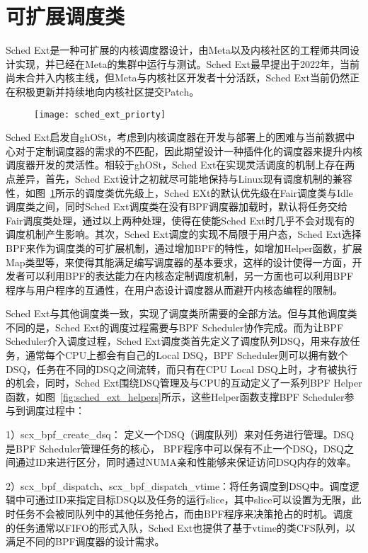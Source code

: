 \section{可扩展调度类}

Sched Ext是一种可扩展的内核调度器设计\citep{schedext}，由Meta以及内核社区的工程师共同设计实现，并已经在Meta的集群中运行与测试。Sched Ext最早提出于2022年，当前尚未合并入内核主线，但Meta与内核社区开发者十分活跃，Sched Ext当前仍然正在积极更新并持续地向内核社区提交Patch。

\begin{figure}[!htbp]
    \centering
    \texttt{[image: sched\_ext\_priorty]}
    \label{fig:sched_ext_priorty}
\end{figure}

Sched Ext启发自ghOSt\citep{humphries2021ghost}，考虑到内核调度器在开发与部署上的困难与当前数据中心对于定制调度器的需求的不匹配，因此期望设计一种插件化的调度器来提升内核调度器开发的灵活性。相较于ghOSt，Sched Ext在实现灵活调度的机制上存在两点差异，首先，Sched Ext设计之初就尽可能地保持与Linux现有调度机制的兼容性，如图~\ref{fig:sched_ext_priorty}所示的调度类优先级上，Sched EXt的默认优先级在Fair调度类与Idle调度类之间，同时Sched Ext调度类在没有BPF调度器加载时，默认将任务交给Fair调度类处理，通过以上两种处理，使得在使能Sched Ext时几乎不会对现有的调度机制产生影响。其次，Sched Ext调度的实现不局限于用户态，Sched Ext选择BPF来作为调度类的可扩展机制，通过增加BPF的特性，如增加Helper函数，扩展Map类型等，来使得其能满足编写调度器的基本要求，这样的设计使得一方面，开发者可以利用BPF的表达能力在内核态定制调度机制，另一方面也可以利用BPF程序与用户程序的互通性，在用户态设计调度器从而避开内核态编程的限制。

Sched Ext与其他调度类一致，实现了调度类所需要的全部方法。但与其他调度类不同的是，Sched Ext的调度过程需要与BPF Scheduler协作完成。而为让BPF Scheduler介入调度过程，Sched Ext调度类首先定义了调度队列DSQ，用来存放任务，通常每个CPU上都会有自己的Local DSQ，BPF Scheduler则可以拥有数个DSQ，任务在不同的DSQ之间流转，而只有在CPU Local DSQ上时，才有被执行的机会，同时，Sched Ext围绕DSQ管理及与CPU的互动定义了一系列BPF Helper函数，如图~\ref{fig:sched_ext_helpers}所示，这些Helper函数支撑BPF Scheduler参与到调度过程中：

1）scx\_bpf\_create\_dsq： 定义一个DSQ（调度队列）来对任务进行管理。DSQ是BPF Scheduler管理任务的核心， BPF程序中可以保有不止一个DSQ，DSQ之间通过ID来进行区分，同时通过NUMA亲和性能够来保证访问DSQ内存的效率。

2）scx\_bpf\_dispatch、scx\_bpf\_dispatch\_vtime：将任务调度到DSQ中。调度逻辑中可通过ID来指定目标DSQ以及任务的运行slice，其中slice可以设置为无限，此时任务不会被同队列中的其他任务抢占，而由BPF程序来决策抢占的时机。调度的任务通常以FIFO的形式入队，Sched Ext也提供了基于vtime的类CFS队列，以满足不同的BPF调度器的设计需求。

